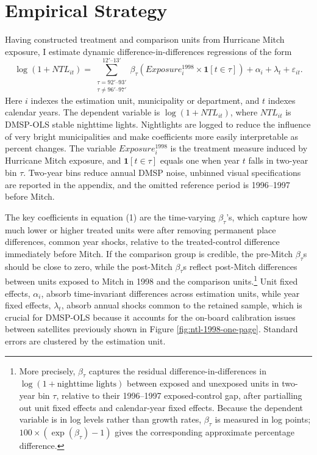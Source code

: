 \documentclass[12pt]{article}
\begin{document}
\section{Empirical Strategy}

Having constructed treatment and comparison units from Hurricane Mitch exposure, I estimate dynamic difference-in-differences regressions of the form
\begin{equation}
    \log(1+NTL_{it})
    =
    \sum_{\substack{\tau=92'\text{--}93'\\ \tau\neq 96'\text{--}97'}}^{12'\text{--}13'}
    \beta_{\tau}
    \left(Exposure_i^{1998}\times \mathbf{1}[t\in \tau]\right)
    +\alpha_i+\lambda_t+\varepsilon_{it}.
\end{equation}
Here $i$ indexes the estimation unit, municipality or department, and $t$ indexes calendar years. The dependent variable is $\log(1+NTL_{it})$, where $NTL_{it}$ is DMSP-OLS stable nighttime lights. Nightlights are logged to reduce the influence of very bright municipalities and make coefficients more easily interpretable as percent changes. The variable $Exposure_i^{1998}$ is the treatment measure induced by Hurricane Mitch exposure, and $\mathbf{1}[t\in\tau]$ equals one when year $t$ falls in two-year bin $\tau$. Two-year bins reduce annual DMSP noise, unbinned visual specifications are reported in the appendix, and the omitted reference period is 1996--1997 before Mitch. 

The key coefficients in equation (1) are the time-varying $\beta_\tau$'s, which capture how much lower or higher treated units were after removing permanent place differences, common year shocks, relative to the treated-control difference immediately before Mitch. If the comparison group is credible, the pre-Mitch $\beta_\tau$s should be close to zero, while the post-Mitch $\beta_\tau$s reflect post-Mitch differences between units exposed to Mitch in 1998 and the comparison units.\footnote{More precisely, $\beta_\tau$ captures the residual difference-in-differences in $\log(1+\text{nighttime lights})$ between exposed and unexposed units in two-year bin $\tau$, relative to their 1996--1997 exposed-control gap, after partialling out unit fixed effects and calendar-year fixed effects. Because the dependent variable is in log levels rather than growth rates, $\beta_\tau$ is measured in log points; $100\times(\exp(\beta_\tau)-1)$ gives the corresponding approximate percentage difference.} Unit fixed effects, $\alpha_i$, absorb time-invariant differences across estimation units, while year fixed effects, $\lambda_t$, absorb annual shocks common to the retained sample, which is crucial for DMSP-OLS because it accounts for the on-board calibration issues between satellites previously shown in Figure \ref{fig:ntl-1998-one-page}. Standard errors are clustered by the estimation unit.
\end{document}
